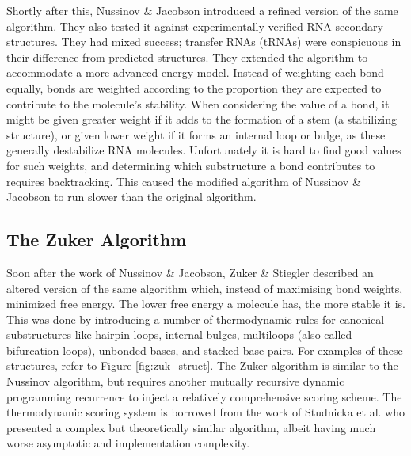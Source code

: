 \documentclass[12pt, a4paper]{article}
\begin{document}
Shortly after this, Nussinov \& Jacobson \cite{nussinov1980fast} introduced
a refined version of the same algorithm. They also tested it against experimentally verified RNA secondary structures. They had mixed success; transfer RNAs
(tRNAs) were conspicuous in their difference from predicted structures. They extended the algorithm to accommodate a more advanced energy model. Instead of weighting each bond equally, bonds are weighted
according to the proportion they are expected to contribute to the molecule's
stability. When considering the value of a bond, it might be given greater
weight if it adds to the formation of a stem (a stabilizing structure), or
given lower weight if it forms an internal loop or bulge, as these generally
destabilize RNA molecules. Unfortunately it is hard to find good values for
such weights, and determining which substructure a bond contributes to requires
backtracking. This caused the modified algorithm of Nussinov \& Jacobson to run slower than the original algorithm.

\subsection{The Zuker Algorithm}
Soon after the work of Nussinov \& Jacobson, Zuker \& Stiegler \cite{zuker1981optimal}
described an altered version of the same algorithm which, instead of maximising
bond weights, minimized free energy. The lower free energy a molecule has, the more stable it is. This was done
by introducing a number of thermodynamic rules for canonical substructures like hairpin loops, internal bulges, multiloops (also called bifurcation loops), unbonded bases, and stacked base pairs. For examples of these structures, refer to Figure \ref{fig:zuk_struct}. The Zuker algorithm is similar to the Nussinov algorithm,
but requires another mutually recursive dynamic programming recurrence to inject a relatively comprehensive scoring scheme. The thermodynamic scoring system is borrowed from the work of Studnicka et al. \cite{studnicka1978computer} who presented a
complex but theoretically similar algorithm, albeit having
much worse asymptotic and implementation complexity. 
\end{document}
